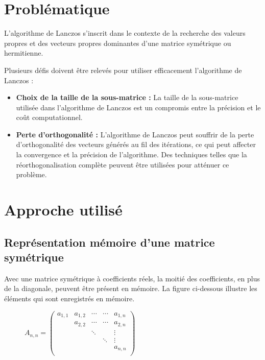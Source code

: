 \documentclass[11pt,french]{article}
\begin{document}
	\section{Problématique}
	\par L'algorithme de Lanczos s'inscrit dans le contexte de la recherche des valeurs propres et des vecteurs propres dominantes d'une matrice symétrique ou hermitienne.
 
    Plusieurs défis doivent être relevés pour utiliser efficacement l'algorithme de Lanczos :
    \begin{itemize}
    \item \textbf{Choix de la taille de la sous-matrice :} La taille de la sous-matrice utilisée dans l'algorithme de Lanczos est un compromis entre la précision et le coût computationnel.

     \item \textbf{Perte d'orthogonalité :} L'algorithme de Lanczos peut souffrir de la perte d'orthogonalité des vecteurs générés au fil des itérations, ce qui peut affecter la convergence et la précision de l'algorithme. Des techniques telles que la réorthogonalisation complète peuvent être utilisées pour atténuer ce problème.
    
    \end{itemize}
	\section{Approche utilisé}
	
	\label{section_memoire}
	\subsection{Représentation mémoire d'une matrice symétrique}
	Avec une matrice symétrique à coefficients réels, la moitié des coefficients, en plus de la diagonale, peuvent être présent en mémoire. La figure ci-dessous illustre les éléments qui sont enregistrés en mémoire.
		\begin{figure}[h]
		\centering
		$A _{n, n}=
		\begin{pmatrix}
			a_{1,1} & a_{1,2}& \cdots & \cdots & a_{1,n} \\  
			   & a_{2,2} & \cdots & \cdots & a_{2,n} \\  
			   &   & \ddots &   & \vdots \\  
			   &   &   & \ddots & \vdots \\  
			   &   &   &   & a_{n,n}\\  
		\end{pmatrix}
		$
	\end{figure}
	 \newpage 
\end{document}
